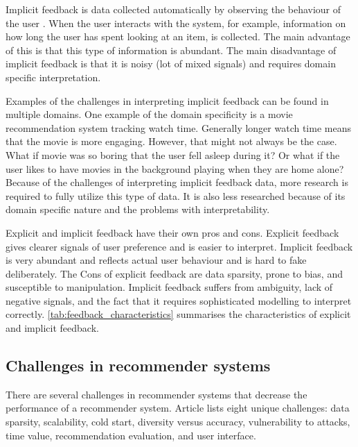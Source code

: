 \documentclass[english, 12pt, a4paper, sci, utf8, a-2b, online]{aaltothesis}
\begin{document}
Implicit feedback is data collected automatically by observing the behaviour of the user \parencite{article_implicit_vs_explicit}. When the user interacts with the system, for example, information on how long the user has spent looking at an item, is collected. The main advantage of this is that this type of information is abundant. The main disadvantage of implicit feedback is that it is noisy (lot of mixed signals) and requires domain specific interpretation. 

Examples of the challenges in interpreting implicit feedback can be found in multiple domains. One example of the domain specificity is a movie recommendation system tracking watch time. Generally longer watch time means that the movie is more engaging. However, that might not always be the case. What if movie was so boring that the user fell asleep during it? Or what if the user likes to have movies in the background playing when they are home alone? Because of the challenges of interpreting implicit feedback data, more research is required to fully utilize this type of data. It is also less researched because of its domain specific nature and the problems with interpretability.

Explicit and implicit feedback have their own pros and cons. Explicit feedback gives clearer signals of user preference and is easier to interpret. Implicit feedback is very abundant and reflects actual user behaviour and is hard to fake deliberately. The Cons of explicit feedback are data sparsity, prone to bias, and susceptible to manipulation. Implicit feedback suffers from ambiguity, lack of negative signals, and the fact that it requires sophisticated modelling to interpret correctly. \autoref{tab:feedback_characteristics} summarises the characteristics of explicit and implicit feedback.



\subsection{Challenges in recommender systems}

There are several challenges in recommender systems that decrease the performance of a recommender system. Article \parencite{lu2012recommender} lists eight unique challenges: data sparsity, scalability, cold start, diversity versus accuracy, vulnerability to attacks, time value, recommendation evaluation, and user interface.


\end{document}
